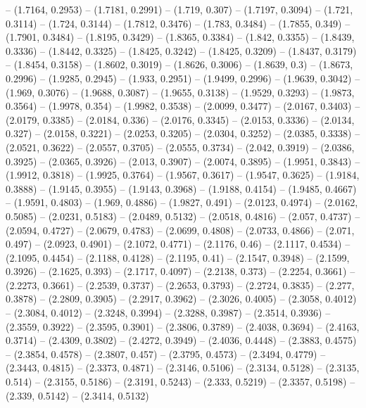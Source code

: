 {   -- (1.7164, 0.2953) -- (1.7181, 0.2991) -- (1.719, 0.307) -- (1.7197, 0.3094)
   -- (1.721, 0.3114) -- (1.724, 0.3144) -- (1.7812, 0.3476) -- (1.783, 0.3484) 
  -- (1.7855, 0.349) -- (1.7901, 0.3484) -- (1.8195, 0.3429) -- (1.8365, 0.3384)
   -- (1.842, 0.3355) -- (1.8439, 0.3336) -- (1.8442, 0.3325) -- (1.8425, 
  0.3242) -- (1.8425, 0.3209) -- (1.8437, 0.3179) -- (1.8454, 0.3158) -- 
  (1.8602, 0.3019) -- (1.8626, 0.3006) -- (1.8639, 0.3) -- (1.8673, 0.2996) -- 
  (1.9285, 0.2945) -- (1.933, 0.2951) -- (1.9499, 0.2996) -- (1.9639, 0.3042) --
   (1.969, 0.3076) -- (1.9688, 0.3087) -- (1.9655, 0.3138) -- (1.9529, 0.3293) 
  -- (1.9873, 0.3564) -- (1.9978, 0.354) -- (1.9982, 0.3538) -- (2.0099, 0.3477)
   -- (2.0167, 0.3403) -- (2.0179, 0.3385) -- (2.0184, 0.336) -- (2.0176, 
  0.3345) -- (2.0153, 0.3336) -- (2.0134, 0.327) -- (2.0158, 0.3221) -- (2.0253,
   0.3205) -- (2.0304, 0.3252) -- (2.0385, 0.3338) -- (2.0521, 0.3622) -- 
  (2.0557, 0.3705) -- (2.0555, 0.3734) -- (2.042, 0.3919) -- (2.0386, 0.3925) --
   (2.0365, 0.3926) -- (2.013, 0.3907) -- (2.0074, 0.3895) -- (1.9951, 0.3843) 
  -- (1.9912, 0.3818) -- (1.9925, 0.3764) -- (1.9567, 0.3617) -- (1.9547, 
  0.3625) -- (1.9184, 0.3888) -- (1.9145, 0.3955) -- (1.9143, 0.3968) -- 
  (1.9188, 0.4154) -- (1.9485, 0.4667) -- (1.9591, 0.4803) -- (1.969, 0.4886) --
   (1.9827, 0.491) -- (2.0123, 0.4974) -- (2.0162, 0.5085) -- (2.0231, 0.5183) 
  -- (2.0489, 0.5132) -- (2.0518, 0.4816) -- (2.057, 0.4737) -- (2.0594, 0.4727)
   -- (2.0679, 0.4783) -- (2.0699, 0.4808) -- (2.0733, 0.4866) -- (2.071, 0.497)
   -- (2.0923, 0.4901) -- (2.1072, 0.4771) -- (2.1176, 0.46) -- (2.1117, 0.4534)
   -- (2.1095, 0.4454) -- (2.1188, 0.4128) -- (2.1195, 0.41) -- (2.1547, 0.3948)
   -- (2.1599, 0.3926) -- (2.1625, 0.393) -- (2.1717, 0.4097) -- (2.2138, 0.373)
   -- (2.2254, 0.3661) -- (2.2273, 0.3661) -- (2.2539, 0.3737) -- (2.2653, 
  0.3793) -- (2.2724, 0.3835) -- (2.277, 0.3878) -- (2.2809, 0.3905) -- (2.2917,
   0.3962) -- (2.3026, 0.4005) -- (2.3058, 0.4012) -- (2.3084, 0.4012) -- 
  (2.3248, 0.3994) -- (2.3288, 0.3987) -- (2.3514, 0.3936) -- (2.3559, 0.3922) 
  -- (2.3595, 0.3901) -- (2.3806, 0.3789) -- (2.4038, 0.3694) -- (2.4163, 
  0.3714) -- (2.4309, 0.3802) -- (2.4272, 0.3949) -- (2.4036, 0.4448) -- 
  (2.3883, 0.4575) -- (2.3854, 0.4578) -- (2.3807, 0.457) -- (2.3795, 0.4573) --
   (2.3494, 0.4779) -- (2.3443, 0.4815) -- (2.3373, 0.4871) -- (2.3146, 0.5106) 
  -- (2.3134, 0.5128) -- (2.3135, 0.514) -- (2.3155, 0.5186) -- (2.3191, 0.5243)
   -- (2.333, 0.5219) -- (2.3357, 0.5198) -- (2.339, 0.5142) -- (2.3414, 0.5132)
}
